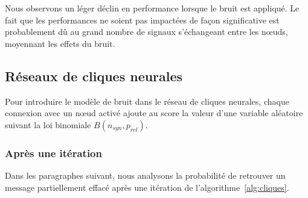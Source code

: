 \documentclass{gretsi}
\begin{document}
\begin{figure}[ht!]
\begin{center}
\end{center}
\label{fig:hopfield}
\end{figure}

Nous observons un léger déclin en performance lorsque le bruit est appliqué. Le fait que les performances ne soient pas impactées de façon significative est probablement d\^u au grand nombre de signaux s'échangeant entre les nœuds, moyennant les effets du bruit.

\subsection{Réseaux de cliques neurales}

Pour introduire le modèle de bruit dans le réseau de cliques neurales, chaque connexion avec un nœud activé ajoute au score la valeur d'une variable aléatoire suivant la loi binomiale $B(n_{syn}, p_{rel})$. 

\subsubsection{Après une itération}

Dans les paragraphes suivant, nous analysons la probabilité de retrouver un message partiellement effacé après une itération de l'algorithme~\ref{alg:cliques}.
\end{document}
